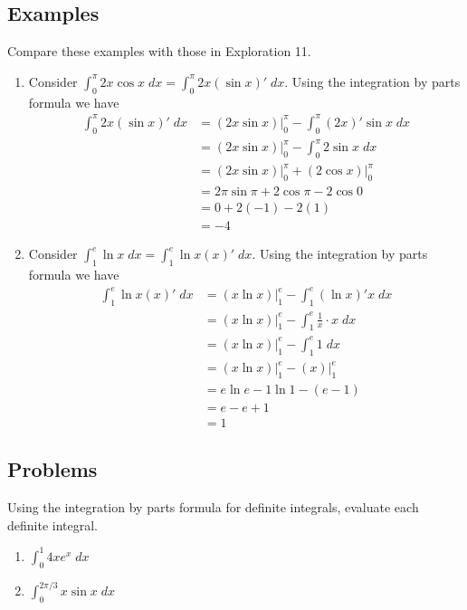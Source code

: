 \documentclass[12pt,letterpaper,fleqn]{article}
\theoremstyle{definition}
\begin{document}
\subsection*{Examples}
Compare these examples with those in Exploration 11.
\begin{enumerate}
  \item Consider $\int_0^{\pi} 2x \cos x\;dx = \int_0^{\pi} 2x (\sin x)'\;dx$. Using the integration by parts formula we have
  \begin{align*}
    \int_0^{\pi} 2x (\sin x)'\;dx &= \left.(2x \sin x)\right|_0^{\pi} - \int_0^{\pi} (2x)' \sin x\;dx\\
    &= \left.(2x \sin x)\right|_0^{\pi} - \int_0^{\pi} 2\sin x\;dx\\
    &= \left.(2x \sin x)\right|_0^{\pi} + \left.(2\cos x)\right|_0^{\pi}\\
    &= 2\pi\sin\pi + 2\cos\pi - 2\cos 0\\
    &= 0 + 2(-1) - 2(1)\\
    &= -4
  \end{align*}
  \item Consider $\int_1^e \ln x\;dx = \int_1^e \ln x (x)'\;dx$. Using the integration by parts formula we have
  \begin{align*}
    \int_1^e \ln x (x)'\;dx &= \left.(x\ln x)\right|_1^e - \int_1^e (\ln x)' x\;dx\\
    &= \left.(x\ln x)\right|_1^e - \int_1^e\frac{1}{x} \cdot x\;dx\\
    &= \left.(x\ln x)\right|_1^e - \int_1^e 1\;dx\\
    &= \left.(x\ln x)\right|_1^e - \left.(x)\right|_1^e\\
    &= e\ln e - 1\ln 1 - (e - 1)\\
    &= e - e + 1\\
    &= 1
  \end{align*}
\end{enumerate}
\subsection*{Problems}
Using the integration by parts formula for definite integrals, evaluate each definite integral.
\begin{enumerate}
  \item $\int_0^1 4x e^x\;dx$
  \item $\int_0^{2\pi/3} x \sin x\;dx$
\end{enumerate}
\end{document}
